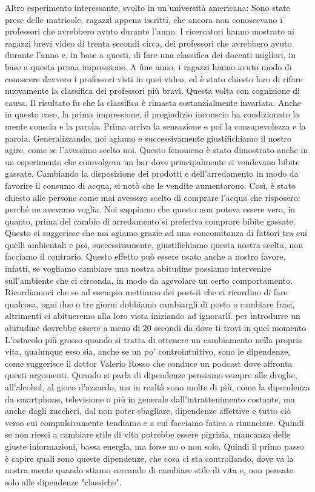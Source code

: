 \documentclass[12pt]{book} %
\begin{document}
Altro esperimento interessante, svolto in un'università americana: Sono state prese delle
matricole, ragazzi appena iscritti, che ancora non conoscevano i professori che avrebbero avuto durante
l'anno. I ricercatori hanno mostrato ai ragazzi brevi video di trenta secondi circa, dei
professori che avrebbero avuto durante l'anno e, in base a questi, di fare una classifica dei
docenti migliori, in base a questa prima impressione. A fine anno, i ragazzi hanno avuto modo di conoscere davvero i
professori visti in quei video, ed è stato chiesto loro di rifare nuovamente la classifica dei professori più bravi.
Questa volta con cognizione di causa. Il risultato fu che la classifica è rimasta sostanzialmente invariata. Anche in
questo caso, la prima impressione, il pregiudizio inconscio ha condizionato la mente conscia e la parola. Prima arriva
la sensazione e poi la consapevolezza e la parola.
Generalizzando, noi agiamo e successivamente giustifichiamo il nostro agire, come se l'avessimo
scelto noi. Questo fenomeno è stato dimostrato anche in un esperimento che coinvolgeva un bar dove principalmente si
vendevano bibite gassate. Cambiando la disposizione dei prodotti e dell'arredamento in modo da
favorire il consumo di acqua, si notò che le vendite aumentarono. Così, è stato chiesto alle persone come mai avessero
scelto di comprare l'acqua che risposero: perché ne avevamo voglia. Noi sappiamo che questo non
poteva essere vero, in quanto, prima del cambio di arredamento si preferiva comprare bibite gassate. Questo ci
suggerisce che noi agiamo grazie ad una concomitanza di fattori tra cui quelli ambientali e poi, successivamente,
giustifichiamo questa nostra scelta, non facciamo il contrario. Questo effetto può essere usato anche a nostro favore,
infatti, se vogliamo cambiare una nostra abitudine possiamo intervenire sull'ambiente che ci
circonda, in modo da agevolare un certo comportamento.
Ricordiamoci che se ad esempio mettiamo dei post-it che ci ricordino di fare qualcosa, ogni due o tre giorni dobbiamo cambiargli di posto o cambiare frasi, altrimenti ci abitueremo alla loro vista iniziando ad ignorarli.
per introdurre un abitudine dovrebbe essere a meno di 20 secondi da dove ti trovi
in quel momento
L'ostacolo più grosso quando si tratta di ottenere un cambiamento nella propria vita, qualunque esso sia, anche se un po' controintuitivo, sono le dipendenze, come suggerisce il dottor Valerio Rosso che conduce un podcast dove affronta questi argomenti. Quando si parla di dipendenze pensiamo sempre alle droghe, all'alcohol, al gioco d'azzardo, ma in realtà sono molte di più, come la dipendenza da smartphone, televisione o più in generale dall'intrattenimento costante, ma anche dagli zuccheri, dal non poter sbagliare, dipendenze affettive e tutto ciò verso cui compulsivamente tendiamo e a cui facciamo fatica a rinunciare. Quindi se non riesci a cambiare stile di vita potrebbe essere pigrizia, mancanza delle giuste informazioni, bassa energia, ma forse no o non solo. Quindi il primo passo è capire quali sono queste dipendenze, che cosa ci sta controllando, dove va la nostra mente quando stiamo cercando di cambiare stile di vita e, non pensate solo alle dipendenze "classiche".
\end{document}
